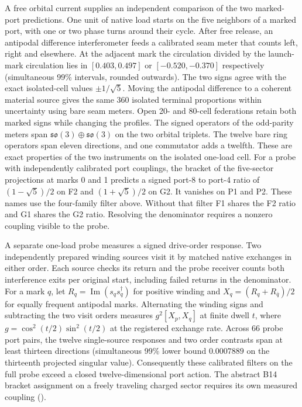 \documentclass[11pt]{article}
\begin{document}
A free orbital current supplies an independent comparison of the two
marked-port predictions. One unit of native load starts on the five
neighbors of a marked port, with one or two phase turns around their
cycle. After free release, an antipodal difference interferometer feeds
a calibrated seam meter that counts left, right and elsewhere.
At the adjacent mark the circulation divided by the launch-mark
circulation lies in $[0.403,0.497]$ or $[-0.520,-0.370]$ respectively
(simultaneous 99\% intervals, rounded outwards). The two signs agree
with the exact isolated-cell values $\pm1/\sqrt5$. Moving the
antipodal difference to a coherent material source gives the same
360 isolated terminal proportions within uncertainty using bare seam
meters. Open 20- and 80-cell federations retain both marked signs while
changing the profiles. The signed operators of the odd-parity meters
span $\mathfrak{so}(3)\oplus\mathfrak{so}(3)$ on the two orbital
triplets. The twelve bare ring operators span eleven directions,
and one commutator adds a twelfth. These are exact properties
of the two instruments on the isolated one-load cell. For a probe
with independently calibrated port couplings, the bracket of the
five-sector projections at marks 0 and 1 predicts a signed port-8
to port-4 ratio of $(1-\sqrt{5})/2$ on F2 and $(1+\sqrt{5})/2$ on
G2. It vanishes on P1 and P2. These names use the four-family
filter above. Without that filter F1 shares the F2 ratio and G1 shares
the G2 ratio. Resolving the denominator requires a nonzero coupling
visible to the probe.

A separate one-load probe measures a signed drive-order response.
Two independently prepared winding sources visit it by matched native
exchanges in either order. Each source checks its return and the probe
receiver counts both interference exits per original start, including
failed returns in the denominator. For a mark $q$, let
$R_q=\operatorname{Im}(s_qs_q^\dagger)$ for positive winding and
$X_q=(R_q+R_{\bar q})/2$ for equally frequent antipodal marks.
Alternating the winding signs and subtracting the two visit orders
measures $g^2[X_p,X_q]$ at finite dwell $t$, where
$g=\cos^2(t/2)\sin^2(t/2)$ at the registered exchange rate. Across
66 probe port pairs, the twelve single-source responses and two order
contrasts span at least thirteen directions (simultaneous 99\% lower
bound $0.0007889$ on the thirteenth projected singular value).
Consequently these calibrated filters on the full probe exceed a closed
twelve-dimensional port action. The abstract B14 bracket assignment on
a freely traveling charged sector requires its own measured
coupling
().
\end{document}

